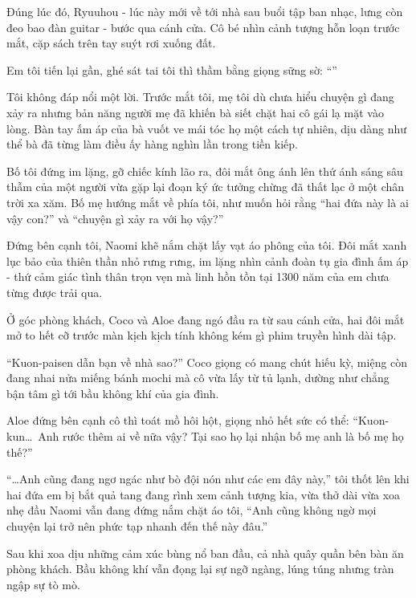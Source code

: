 ﻿\documentclass[../main.tex]{subfiles}
\begin{document}
Đúng lúc đó, Ryuuhou - lúc này mới về tới nhà sau buổi tập ban nhạc, lưng còn đeo bao đàn guitar - bước qua cánh cửa. Cô bé nhìn cảnh tượng hỗn loạn trước mắt, cặp sách trên tay suýt rơi xuống đất.

Em tôi tiến lại gần, ghé sát tai tôi thì thầm bằng giọng sững sờ: ``''

Tôi không đáp nổi một lời. Trước mắt tôi, mẹ tôi dù chưa hiểu chuyện gì đang xảy ra nhưng bản năng người mẹ đã khiến bà siết chặt hai cô gái lạ mặt vào lòng. Bàn tay ấm áp của bà vuốt ve mái tóc họ một cách tự nhiên, dịu dàng như thể bà đã từng làm điều ấy hàng nghìn lần trong tiền kiếp.

Bố tôi đứng im lặng, gỡ chiếc kính lão ra, đôi mắt ông ánh lên thứ ánh sáng sâu thẫm của một người vừa gặp lại đoạn ký ức tưởng chừng đã thất lạc ở một chân trời xa xăm. Bố mẹ hướng mắt về phía tôi, như muốn hỏi rằng ``hai đứa này là ai vậy con?'' và ``chuyện gì xảy ra với họ vậy?''

Đứng bên cạnh tôi, Naomi khẽ nắm chặt lấy vạt áo phông của tôi. Đôi mắt xanh lục bảo của thiên thần nhỏ rưng rưng, im lặng nhìn cảnh đoàn tụ gia đình ấm áp - thứ cảm giác tình thân trọn vẹn mà linh hồn tồn tại 1300 năm của em chưa từng được trải qua.


Ở góc phòng khách, Coco và Aloe đang ngó đầu ra từ sau cánh cửa, hai đôi mắt mở to hết cỡ trước màn kịch kịch tính không kém gì phim truyền hình dài tập.

``Kuon-paisen dẫn bạn về nhà sao?'' Coco giọng có mang chút hiếu kỳ, miệng còn đang nhai nửa miếng bánh mochi mà cô vừa lấy từ tủ lạnh, dường như chẳng bận tâm gì tới bầu không khí của gia đình.

Aloe đứng bên cạnh cô thì toát mồ hôi hột, giọng nhỏ hết sức có thể: ``Kuon-kun\dots\ Anh rước thêm ai về nữa vậy? Tại sao họ lại nhận bố mẹ anh là bố mẹ họ thế?''

``\dots Anh cũng đang ngơ ngác như bò đội nón như các em đây này,'' tôi thốt lên khi hai đứa em bị bắt quả tang đang rình xem cảnh tượng kia, vừa thở dài vừa xoa nhẹ đầu Naomi vẫn đang đứng nắm chặt áo tôi, ``Anh cũng không ngờ mọi chuyện lại trở nên phức tạp nhanh đến thế này đâu.''

\ct

Sau khi xoa dịu những cảm xúc bùng nổ ban đầu, cả nhà quây quần bên bàn ăn phòng khách. Bầu không khí vẫn đọng lại sự ngỡ ngàng, lúng túng nhưng tràn ngập sự tò mò.
\end{document}

